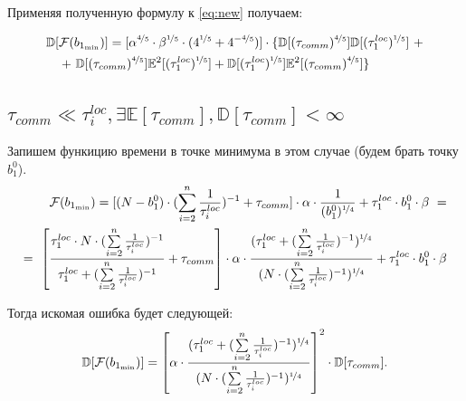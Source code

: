 \documentclass{article}
\begin{document}
Применяя полученную формулу к \eqref{eq:new} получаем:

\begin{eqnarray}
    \begin{split}
    \label{eq:new1}
        \mathbb D [\mathcal{F}(b_{1_{\min}})] = [\alpha^{\nicefrac{4}{5}}\cdot\beta^{\nicefrac{1}{5}}\cdot(4^{\nicefrac{1}{5}} + 4^{-\nicefrac{4}{5}})]\cdot\{\mathbb D [(\tau_{comm})^{\nicefrac{4}{5}}]\mathbb D [(\tau_1^{loc})^{\nicefrac{1}{5}}]~+
        \\ + ~ \vspace{3cm}
         \mathbb D [(\tau_{comm})^{\nicefrac{4}{5}}]\mathbb E^2 [(\tau_1^{loc})^{\nicefrac{1}{5}}] + \mathbb D [(\tau_1^{loc})^{\nicefrac{1}{5}}]\mathbb E^2 [(\tau_{comm})^{\nicefrac{4}{5}}]\}  \hspace{1.5cm}
    \end{split}
\end{eqnarray}

\subsection{$\tau_{comm} \ll \tau_i^{loc}, \exists \mathbb E [\tau_{comm}], \mathbb D [\tau_{comm}] < \infty$}

Запишем функицию времени в точке минимума в этом случае (будем брать точку $b_1^0$). 
\begin{eqnarray}
    \label{eq:new2}
    \begin{split}
        \mathcal{F}(b_{1_{\min}}) = [(N - b_1^0)\cdot(\sum\limits_{i = 2}^n \frac{1}{\tau_i^{loc}})^{-1} + \tau_{comm}]\cdot\alpha\cdot\frac{1}{(b_1^0)^{\nicefrac{1}{4}}} + \tau_1^{loc}\cdot b_1^0\cdot\beta ~= 
        \\ =~
        \left[\frac{\tau_1^{loc}\cdot N\cdot (\sum\limits_{i = 2}^n \frac{1}{\tau_i^{loc}})^{-1}}{\tau_1^{loc} + (\sum\limits_{i = 2}^n \frac{1}{\tau_i^{loc}})^{-1}} + \tau_{comm}\right]\cdot\alpha\cdot\frac{(\tau_1^{loc} + (\sum\limits_{i = 2}^n \frac{1}{\tau_i^{loc}})^{-1})^{\nicefrac{1}{4}}}{(N\cdot (\sum\limits_{i = 2}^n \frac{1}{\tau_i^{loc}})^{-1})^{\nicefrac{1}{4}}} + \tau_1^{loc}\cdot b_1^0\cdot\beta
    \end{split}
\end{eqnarray}

Тогда искомая ошибка будет следующей:
\begin{equation}
    \mathbb D [\mathcal{F}(b_{1_{\min}})] = \left[\alpha\cdot\frac{(\tau_1^{loc} + (\sum\limits_{i = 2}^n \frac{1}{\tau_i^{loc}})^{-1})^{\nicefrac{1}{4}}}{(N\cdot (\sum\limits_{i = 2}^n \frac{1}{\tau_i^{loc}})^{-1})^{\nicefrac{1}{4}}}\right]^2\cdot \mathbb D [\tau_{comm}].
\end{equation}
\end{document}
